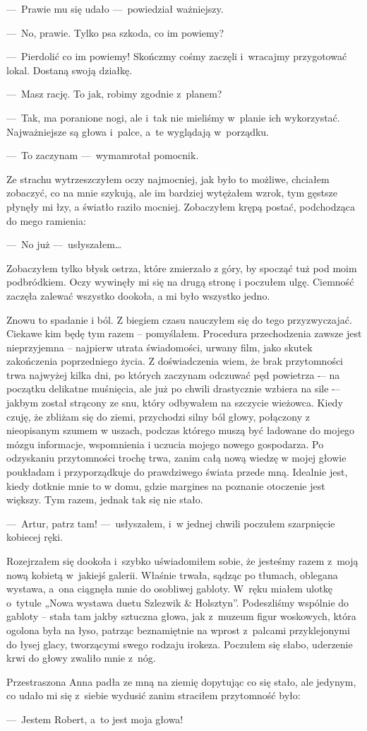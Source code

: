 ---~Prawie mu się udało ---~powiedział ważniejszy.

---~No, prawie. Tylko psa szkoda, co im powiemy?

---~Pierdolić co im powiemy! Skończmy cośmy zaczęli i~wracajmy przygotować lokal. Dostaną swoją działkę.

---~Masz rację. To jak, robimy zgodnie z~planem? 

---~Tak, ma poranione nogi, ale i~tak nie mieliśmy w~planie ich wykorzystać. Najważniejsze są głowa i~palce, a~te wyglądają w~porządku.

---~To zaczynam ---~wymamrotał pomocnik.

Ze strachu wytrzeszczyłem oczy najmocniej, jak było to możliwe, chciałem zobaczyć, co na mnie szykują, ale im bardziej wytężałem wzrok, tym gęstsze płynęły mi łzy, a światło raziło mocniej. Zobaczyłem krępą postać, podchodząca do mego ramienia: 

---~No już ---~usłyszałem…

Zobaczyłem tylko błysk ostrza, które zmierzało z góry, by spocząć tuż pod moim podbródkiem. Oczy wywinęły mi się na drugą stronę i poczułem ulgę. Ciemność zaczęła zalewać wszystko dookoła, a mi było wszystko jedno. 

\paraSep

Znowu to spadanie i ból. Z biegiem czasu nauczyłem się do tego przyzwyczajać. Ciekawe kim będę tym razem – pomyślałem. Procedura przechodzenia zawsze jest nieprzyjemna – najpierw utrata świadomości, urwany film, jako skutek zakończenia poprzedniego życia. Z doświadczenia wiem, że brak przytomności trwa najwyżej kilka dni, po których zaczynam odczuwać pęd powietrza -– na początku delikatne muśnięcia, ale już po chwili drastycznie wzbiera na sile -– jakbym został strącony ze snu, który odbywałem na szczycie wieżowca. Kiedy czuję, że zbliżam się do ziemi, przychodzi silny ból głowy, połączony z nieopisanym szumem w uszach, podczas którego muszą być ładowane do mojego mózgu informacje, wspomnienia i uczucia mojego nowego gospodarza. Po odzyskaniu przytomności trochę trwa, zanim całą nową wiedzę w mojej głowie poukładam i przyporządkuje do prawdziwego świata przede mną. Idealnie jest, kiedy dotknie mnie to w domu, gdzie margines na poznanie otoczenie jest większy. Tym razem, jednak tak się nie stało. 

---~Artur, patrz tam! ---~usłyszałem, i~w jednej chwili poczułem szarpnięcie kobiecej ręki.
 
Rozejrzałem się dookoła i~szybko uświadomiłem sobie, że jesteśmy razem z~moją nową kobietą w~jakiejś galerii. Właśnie trwała, sądząc po tłumach, oblegana wystawa, a~ona ciągnęła mnie do osobliwej gabloty. W~ręku miałem ulotkę o~tytule „Nowa wystawa duetu Szlezwik \& Holsztyn”. Podeszliśmy wspólnie do gabloty -- stała tam jakby sztuczna głowa, jak z~muzeum figur woskowych, która ogolona była na łyso, patrząc beznamiętnie na wprost z~palcami przyklejonymi do łysej glacy, tworzącymi swego rodzaju irokeza. Poczułem się słabo, uderzenie krwi do głowy zwaliło mnie z~nóg. 

Przestraszona Anna padła ze mną na ziemię dopytując co się stało, ale jedynym, co udało mi się z~siebie wydusić zanim straciłem przytomność było: 

---~Jestem Robert, a~to jest moja głowa!
